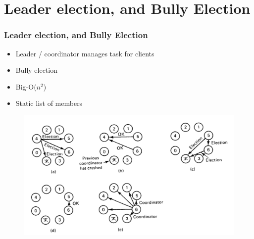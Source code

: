 \documentclass{beamer}
\begin{document}
\section{Leader election, and Bully Election}
	\begin{frame}
		\frametitle{Leader election, and Bully Election}
		
		\begin{itemize}
		\item Leader / coordinator manages task for clients
		\item Bully election
		\item Big-O($n^2$)
		\item Static list of members
		\end{itemize}
		
		\begin{figure}[hbtp]
		\centering
		\includegraphics[scale=0.5]{BullyAlgorithm}
		\end{figure}		
				
	\end{frame}
	
\end{document}
